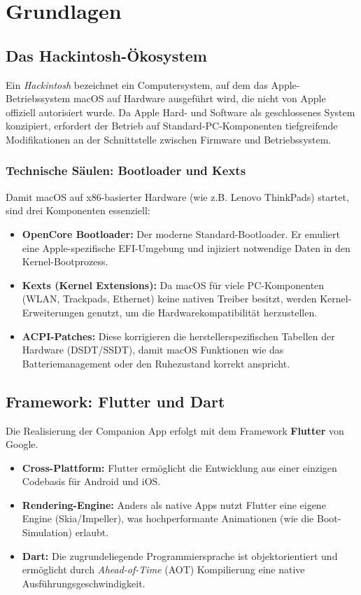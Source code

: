\chapter{Grundlagen} %
\label{sec:grundlagen}

\section{Das Hackintosh-Ökosystem}
Ein \textit{Hackintosh} bezeichnet ein Computersystem, auf dem das Apple-Betriebssystem macOS auf Hardware ausgeführt wird, die nicht von Apple offiziell autorisiert wurde. Da Apple Hard- und Software als geschlossenes System konzipiert, erfordert der Betrieb auf Standard-PC-Komponenten tiefgreifende Modifikationen an der Schnittstelle zwischen Firmware und Betriebssystem.

\subsection{Technische Säulen: Bootloader und Kexts}
Damit macOS auf x86-basierter Hardware (wie z.B. Lenovo ThinkPads) startet, sind drei Komponenten essenziell:
\begin{itemize}
    \item \textbf{OpenCore Bootloader:} Der moderne Standard-Bootloader. Er emuliert eine Apple-spezifische EFI-Umgebung und injiziert notwendige Daten in den Kernel-Bootprozess.
    \item \textbf{Kexts (Kernel Extensions):} Da macOS für viele PC-Komponenten (WLAN, Trackpads, Ethernet) keine nativen Treiber besitzt, werden Kernel-Erweiterungen genutzt, um die Hardwarekompatibilität herzustellen.
    \item \textbf{ACPI-Patches:} Diese korrigieren die herstellerspezifischen Tabellen der Hardware (DSDT/SSDT), damit macOS Funktionen wie das Batteriemanagement oder den Ruhezustand korrekt anspricht.
\end{itemize}

\section{Framework: Flutter und Dart}
Die Realisierung der Companion App erfolgt mit dem Framework \textbf{Flutter} von Google.
\begin{itemize}
    \item \textbf{Cross-Plattform:} Flutter ermöglicht die Entwicklung aus einer einzigen Codebasis für Android und iOS.
    \item \textbf{Rendering-Engine:} Anders als native Apps nutzt Flutter eine eigene Engine (Skia/Impeller), was hochperformante Animationen (wie die Boot-Simulation) erlaubt.
    \item \textbf{Dart:} Die zugrundeliegende Programmiersprache ist objektorientiert und ermöglicht durch \textit{Ahead-of-Time} (AOT) Kompilierung eine native Ausführungsgeschwindigkeit.
\end{itemize}

